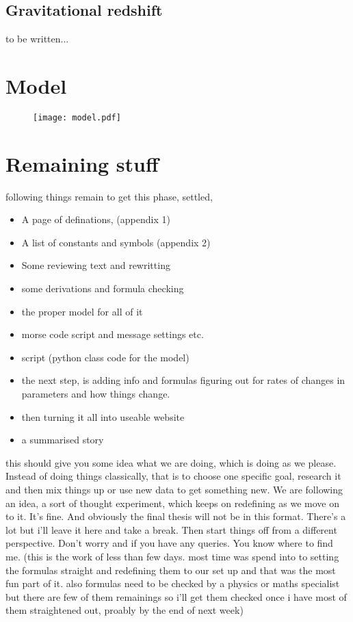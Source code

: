 \documentclass[9pt,a4paper,twocolumn,twoside]{tau-class/tau}
\begin{document}
  \subsection*{Gravitational redshift}

  to be written...

  \section*{Model}

  \begin{figure}[H]
    \texttt{[image: model.pdf]}
  \end{figure}
  
  \section*{Remaining stuff}

  following things remain to get this phase, settled, 

  \begin{itemize}
    \item A page of definations, (appendix 1)
    \item A list of constants and symbols (appendix 2)
    \item Some reviewing text and rewritting
    \item some derivations and formula checking
    \item the proper model for all of it 
    \item morse code script and message settings etc. 
    \item script (python class code for the model)
    \item the next step, is adding info and formulas figuring out for rates of changes in parameters and how things change.
    \item then turning it all into useable website
    \item a summarised story
  \end{itemize}

  this should give you some idea what we are doing, which is doing as we please. Instead of doing things classically, that is to choose one specific goal, research it and then mix things up or use new data to get something new. We are following an idea, a sort of thought experiment, which keeps on redefining as we move on to it. It's fine. And obviously the final thesis will not be in this format. There's a lot but i'll leave it here and take a break. Then start things off from a different perspective. Don't worry and if you have any queries. You know where to find me. (this is the work of less than few days. most time was spend into to setting the formulas straight and redefining them to our set up and that was the most fun part of it. also formulas need to be checked by a physics or maths specialist but there are few of them remainings so i'll get them checked once i have most of them straightened out, proably by the end of next week)
\end{document}
